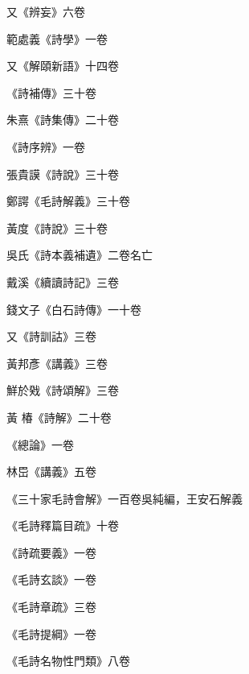 \begin{pinyinscope}
 又《辨妄》六卷



 範處義《詩學》一卷



 又《解頤新語》十四卷



 《詩補傳》三十卷



 朱熹《詩集傳》二十卷



 《詩序辨》一卷



 張貴謨《詩說》三十卷



 鄭諤《毛詩解義》三十卷



 黃度《詩說》三十卷



 吳氏《詩本義補遺》二卷名亡



 戴溪《續讀詩記》三卷



 錢文子《白石詩傳》一十卷



 又《詩訓詁》三卷



 黃邦彥《講義》三卷



 鮮於戣《詩頌解》三卷



 黃
 椿《詩解》二十卷



 《總論》一卷



 林岊《講義》五卷



 《三十家毛詩會解》一百卷吳純編，王安石解義



 《毛詩釋篇目疏》十卷



 《詩疏要義》一卷



 《毛詩玄談》一卷



 《毛詩章疏》三卷



 《毛詩提綱》一卷



 《毛詩名物性門類》八卷




\end{pinyinscope}
